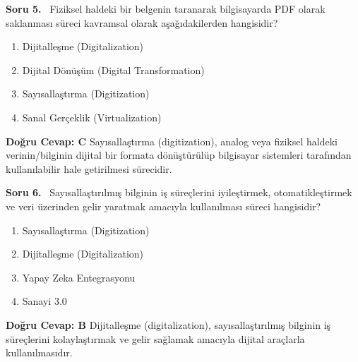 \documentclass[11pt,a4paper,openany]{book}
\begin{document}
\needspace{5cm}
\vspace{8pt}
\noindent\textbf{\large\sffamily Soru 5.} \ Fiziksel haldeki bir belgenin taranarak bilgisayarda PDF olarak saklanması süreci kavramsal olarak aşağıdakilerden hangisidir?
\begin{enumerate}[label=\Alph*), leftmargin=25pt, topsep=4pt, itemsep=2pt]
    \item Dijitalleşme (Digitalization)
    \item Dijital Dönüşüm (Digital Transformation)
    \item Sayısallaştırma (Digitization)
    \item Sanal Gerçeklik (Virtualization)
\end{enumerate}
\vspace{4pt}
\begin{tcolorbox}[title=Cevap ve Açıklama, colback=gray!3!white, colframe=primarycolor!90!black, arc=2mm, fonttitle=\bfseries\sffamily, top=6pt, bottom=6pt]
    \textbf{Doğru Cevap: C}
    \vspace{2pt}
    Sayısallaştırma (digitization), analog veya fiziksel haldeki verinin/bilginin dijital bir formata dönüştürülüp bilgisayar sistemleri tarafından kullanılabilir hale getirilmesi sürecidir.
\end{tcolorbox}
\vspace{10pt}

\needspace{5cm}
\vspace{8pt}
\noindent\textbf{\large\sffamily Soru 6.} \ Sayısallaştırılmış bilginin iş süreçlerini iyileştirmek, otomatikleştirmek ve veri üzerinden gelir yaratmak amacıyla kullanılması süreci hangisidir?
\begin{enumerate}[label=\Alph*), leftmargin=25pt, topsep=4pt, itemsep=2pt]
    \item Sayısallaştırma (Digitization)
    \item Dijitalleşme (Digitalization)
    \item Yapay Zeka Entegrasyonu
    \item Sanayi 3.0
\end{enumerate}
\vspace{4pt}
\begin{tcolorbox}[title=Cevap ve Açıklama, colback=gray!3!white, colframe=primarycolor!90!black, arc=2mm, fonttitle=\bfseries\sffamily, top=6pt, bottom=6pt]
    \textbf{Doğru Cevap: B}
    \vspace{2pt}
    Dijitalleşme (digitalization), sayısallaştırılmış bilginin iş süreçlerini kolaylaştırmak ve gelir sağlamak amacıyla dijital araçlarla kullanılmasıdır.
\end{tcolorbox}
\vspace{10pt}
\end{document}
